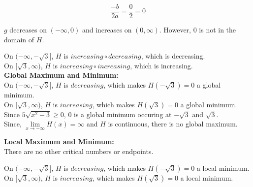\documentclass{ximera}
\begin{document}
\[
\frac{-b}{2 a} = \frac{0}{2} = 0
\]


$g$ decreases on $(-\infty, 0)$ and increases on $(0, \infty)$.  However, $0$ is not in the domain of $H$.





On $(-\infty, -\sqrt{3}]$, $H$ is $increasing \circ decreasing$, which is decreasing. \\


On $[\sqrt{3}, \infty)$, $H$ is $increasing \circ increasing$, which is increasing. \\











\textbf{\textcolor{blue!55!black}{Global Maximum and Minimum:}} \\



On $(-\infty, -\sqrt{3}]$, $H$ is $decreasing$, which makes $H(-\sqrt{3}) = 0$ a global minimum.  \\


On $[\sqrt{3}, \infty)$, $H$ is $increasing$, which makes $H(\sqrt{3}) = 0$ a global minimum.  \\





Since $5 \sqrt{x^2-3} \geq 0$, $0$ is a global minimum occuring at $-\sqrt{3}$ and $\sqrt{3}$. \\






Since, $\lim\limits_{x \to -\infty} H(x) = \infty$ and $H$ is continuous, there is no global maximum. 











\textbf{\textcolor{blue!55!black}{Local Maximum and Minimum:}} \\


There are no other critical numbers or endpoints.



On $(-\infty, -\sqrt{3}]$, $H$ is $decreasing$, which makes $H(-\sqrt{3}) = 0$ a local minimum.  \\


On $[\sqrt{3}, \infty)$, $H$ is $increasing$, which makes $H(\sqrt{3}) = 0$ a local minimum.  \\
\end{document}
